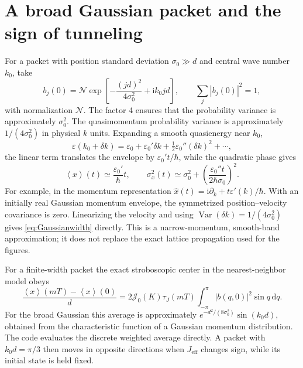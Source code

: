 \documentclass[11pt,oneside]{report}
\numberwithin{equation}{chapter}
\newcommand{\Jeff}{J_{\mathrm{eff}}}
\newcommand{\ii}{\mathrm i}
\newcommand{\dd}{\mathrm d}
\newcommand{\avg}[1]{\left\langle #1\right\rangle}
\begin{document}
\section{A broad Gaussian packet and the sign of tunneling}
For a packet with position standard deviation $\sigma_0\gg d$ and central wave number $k_0$, take
\begin{equation}\label{eq:gaussian}
 b_j(0)=\mathcal N\exp\!\left[-\frac{(jd)^2}{4\sigma_0^2}+\ii k_0jd\right],\qquad \sum_j|b_j(0)|^2=1,
\end{equation}
with normalization $\mathcal N$. The factor 4 ensures that the probability variance is approximately $\sigma_0^2$. The quasimomentum probability variance is approximately $1/(4\sigma_0^2)$ in physical $k$ units. Expanding a smooth quasienergy near $k_0$,
\begin{equation}
 \varepsilon(k_0+\delta k)=\varepsilon_0+\varepsilon_0'\delta k+\tfrac12\varepsilon_0''(\delta k)^2+\cdots,
\end{equation}
the linear term translates the envelope by $\varepsilon_0't/\hbar$, while the quadratic phase gives
\begin{equation}\label{eq:Gaussianwidth}
 \avg{x}(t)\simeq\frac{\varepsilon_0'}{\hbar}t,\qquad
 \sigma_x^2(t)\simeq\sigma_0^2+\left(\frac{\varepsilon_0''t}{2\hbar\sigma_0}\right)^2.
\end{equation}
For example, in the momentum representation $\hat x(t)=\ii\partial_k+t\varepsilon'(k)/\hbar$. With an initially real Gaussian momentum envelope, the symmetrized position--velocity covariance is zero. Linearizing the velocity and using $\operatorname{Var}(\delta k)=1/(4\sigma_0^2)$ gives \cref{eq:Gaussianwidth} directly. This is a narrow-momentum, smooth-band approximation; it does not replace the exact lattice propagation used for the figures.

For a finite-width packet the exact stroboscopic center in the nearest-neighbor model obeys
\begin{equation}\label{eq:packetvelocity}
 \frac{\avg{x}(mT)-\avg{x}(0)}{d}=2\mathcal J_0(K)\tau_J(mT)\int_{-\pi}^{\pi}|b(q,0)|^2\sin q\,\dd q.
\end{equation}
For the broad Gaussian this average is approximately $e^{-d^2/(8\sigma_0^2)}\sin(k_0d)$, obtained from the characteristic function of a Gaussian momentum distribution. The code evaluates the discrete weighted average directly. A packet with $k_0d=\pi/3$ then moves in opposite directions when $\Jeff$ changes sign, while its initial state is held fixed.
\end{document}
